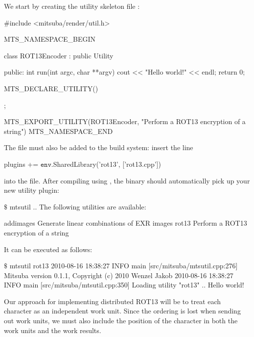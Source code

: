 We start by creating the utility skeleton file :
\begin{cpp}
#include <mitsuba/render/util.h>

MTS_NAMESPACE_BEGIN

class ROT13Encoder : public Utility {
public:
    int run(int argc, char **argv) {
        cout << "Hello world!" << endl;
        return 0;
    }

    MTS_DECLARE_UTILITY()
};

MTS_EXPORT_UTILITY(ROT13Encoder, "Perform a ROT13 encryption of a string")
MTS_NAMESPACE_END
\end{cpp}
The file must also be added to the build system: insert the line
\begin{shell}
plugins += $\texttt{env}$.SharedLibrary('rot13', ['rot13.cpp'])
\end{shell}
into the  file. After compiling
using , the  binary should automatically pick up your new utility plugin:
\begin{shell}
$\texttt{\$}$ mtsutil
..
The following utilities are available:

    addimages             Generate linear combinations of EXR images
    rot13                 Perform a ROT13 encryption of a string
\end{shell}
It can be executed as follows:
\begin{shell}
$\texttt{\$}$ mtsutil rot13
2010-08-16 18:38:27 INFO  main [src/mitsuba/mtsutil.cpp:276] Mitsuba version 0.1.1, Copyright (c) 2010 Wenzel Jakob
2010-08-16 18:38:27 INFO  main [src/mitsuba/mtsutil.cpp:350] Loading utility "rot13" ..
Hello world!
\end{shell}

Our approach for implementing distributed ROT13 will be to treat each character as an
independent work unit. Since the ordering is lost when sending out work units, we must
also include the position of the character in both the work units and the work results.

